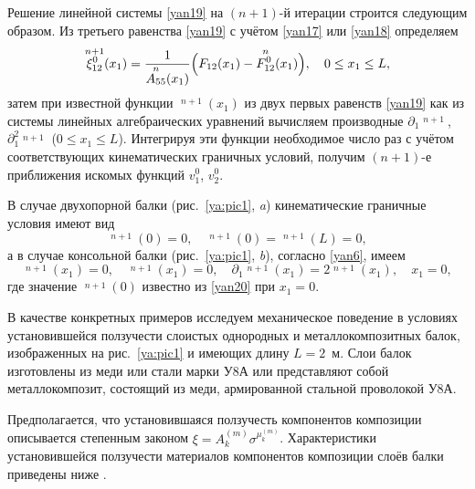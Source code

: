 Решение линейной системы \eqref{yan19} на $(n+1)$-й итерации строится следующим образом. Из третьего равенства \eqref{yan19} с учётом \eqref{yan17} или \eqref{yan18} определяем
\begin{equation}
\label{yan20}
\mathop{\xi_{12}^0}\limits^{n+1}(x_1)=\frac{1}{\mathop{A_{55}}\limits^n(x_1)}\Bigl(F_{12}(x_1)-\mathop{F_{12}^0}\limits^n(x_1)\Bigr),\quad 0\le x_1\le L,
\end{equation}
затем при известной функции $\mathop{\xi_{12}^0}\limits^{n+1}(x_1)$ из двух первых равенств \eqref{yan19} как из системы линейных алгебраических уравнений вычисляем производные $\partial_1\mathop{v_1^0}\limits^{n+1}$, $\partial_1^2\mathop{v_2^0}\limits^{n+1}$ ($0\le x_1\le L$). Интегрируя эти функции необходимое число раз с учётом соответствующих кинематических граничных условий, получим $(n+1)$-е приближения искомых функций $v_1^0$, $v_2^0$.

В случае двухопорной балки (рис.~\ref{ya:pic1}, {\sl a}) кинематические граничные условия имеют вид
\begin{equation}
\label{yan21}
\mathop{v_1^0}\limits^{n+1}(0)=0,\quad \mathop{v_2^0}\limits^{n+1}(0)=\mathop{v_2^0}\limits^{n+1}(L)=0,
\end{equation}
а в случае консольной балки (рис.~\ref{ya:pic1}, {\sl b}), согласно \eqref{yan6}, имеем
\begin{equation}
\label{yan22}
\mathop{v_1^0}\limits^{n+1}(x_1)=0,\quad \mathop{v_2^0}\limits^{n+1}(x_1)=0,\quad \partial_1\mathop{v_2^0}\limits^{n+1}(x_1)=2\mathop{\xi_{12}^0}\limits^{n+1}(x_1),\quad x_1=0,
\end{equation}
где значение $\mathop{\xi_{12}^0}\limits^{n+1}(0)$ известно из \eqref{yan20} при $x_1=0$.

\smallskip

В качестве конкретных примеров исследуем механическое поведение в условиях установившейся ползучести слоистых однородных и металлокомпозитных балок, изображенных на рис.~\ref{ya:pic1} и имеющих длину $L=2$~м. 
Слои балок изготовлены из меди или стали марки У8А или представляют собой металлокомпозит, состоящий из меди, армированной стальной проволокой У8А.

Предполагается, что установившаяся ползучесть компонентов композиции описывается степенным законом $\xi=A_k^{(m)}\sigma^{\mu_k^{(m)}}$. 
Характеристики установившейся ползучести материалов компонентов композиции слоёв балки приведены ниже \cite{yan:bib14, yan:bib15}.

